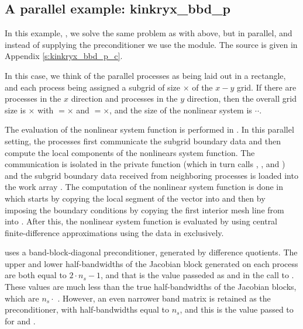 
\subsection{A parallel example: kinkryx\_bbd\_p}\label{ss:kinkryx_bbd_p}

In this example, , we solve the same problem as with 
above, but in parallel, and instead of supplying the preconditioner we use the
{\kinbbdpre} module.  The source is given in Appendix \ref{s:kinkryx_bbd_p_c}.

In this case, we think of the parallel {\mpi} processes as
being laid out in a rectangle, and each process being assigned a
subgrid of size $\times$ of the $x-y$ grid. If
there are  processes in the $x$ direction and 
processes in the $y$ direction, then the overall grid size is
$\times$ with $=$$\times$ and
$=$$\times$, and the size of the nonlinear system is
$\cdot$$\cdot$.  

The evaluation of the nonlinear system function is performed in .
In this parallel setting, the processes first communicate the subgrid
boundary data and then compute the local components of the nonlinears system
function. The {\mpi} communication is isolated in the private function 
(which in turn calls , , and ) and the 
subgrid boundary data received from neighboring processes is loaded into the
work array . The computation of the nonlinear system function is done
in  which starts by copying the local segment of the 
vector into  and then by imposing the boundary conditions by copying the
first interior mesh line from  into . After this, the nonlinear
system function is evaluated by using central finite-difference approximations
using the data in  exclusively.

{\kinbbdpre} uses a band-block-diagonal preconditioner, generated by difference
quotients.  The upper and lower half-bandwidths of the Jacobian block generated
on each process are both equal to $2 \cdot n_s - 1$, and that is the value
passeded as  and  in the call to .
These values are much less than the true half-bandwidths of the Jacobian blocks,
which are $n_s \cdot$ .  However, an even narrower band matrix
is retained as the preconditioner, with half-bandwidths equal to $n_s$, and this
is the value passed to  for  and .

